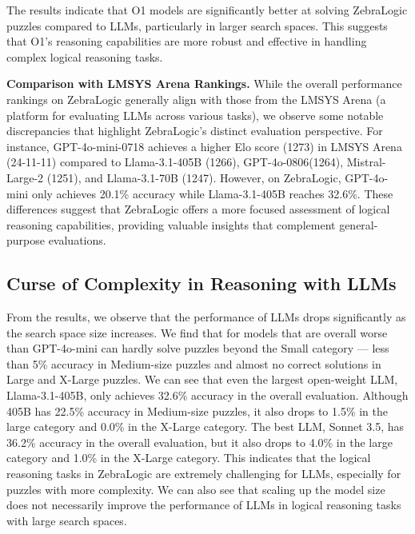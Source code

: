 The results indicate that O1 models are significantly better at solving ZebraLogic puzzles compared to LLMs, particularly in larger search spaces. This suggests that O1's reasoning capabilities are more robust and effective in handling complex logical reasoning tasks.

\textbf{Comparison with LMSYS Arena Rankings.}
While the overall performance rankings on ZebraLogic generally align with those from the LMSYS Arena (a platform for evaluating LLMs across various tasks), we observe some notable discrepancies that highlight ZebraLogic's distinct evaluation perspective. For instance, GPT-4o-mini-0718 achieves a higher Elo score (1273) in LMSYS Arena (24-11-11) compared to Llama-3.1-405B (1266), GPT-4o-0806(1264), Mistral-Large-2 (1251), and Llama-3.1-70B (1247). However, on ZebraLogic, GPT-4o-mini only achieves 20.1\% accuracy while Llama-3.1-405B reaches 32.6\%. These differences suggest that ZebraLogic offers a more focused assessment of logical reasoning capabilities, providing valuable insights that complement general-purpose evaluations.


\subsection{Curse of Complexity in Reasoning with LLMs}
From the results, we observe that the performance of LLMs drops significantly as the search space size increases.
We find that for models that are overall worse than GPT-4o-mini can hardly solve puzzles beyond the Small category --- less than 5\% accuracy in Medium-size puzzles and almost no correct solutions in Large and X-Large puzzles.
We can see that even the largest open-weight LLM, Llama-3.1-405B, only achieves 32.6\% accuracy in the overall evaluation.
Although 405B has 22.5\% accuracy in Medium-size puzzles, it also drops to 1.5\% in the large category and 0.0\% in the X-Large category.
The best LLM, Sonnet 3.5, has 36.2\% accuracy in the overall evaluation, but it also drops to 4.0\% in the large category and 1.0\% in the X-Large category.
This indicates that the logical reasoning tasks in ZebraLogic are extremely challenging for LLMs, especially for puzzles with more complexity.
We can also see that scaling up the model size does not necessarily improve the performance of LLMs in logical reasoning tasks with large search spaces. 


